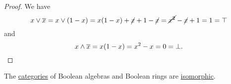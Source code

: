 \begin{proof}
   We have
  \begin{equation*}
    x \vee \oline x
    =
    x \vee (1 - x)
    =
    x(1 - x) + \cancel{x} + 1 - \cancel{x}
    =
    \cancel{x^2} - \cancel{x} + 1
    =
    1
    =
    \top
  \end{equation*}
  and
  \begin{equation*}
    x \wedge \oline x
    =
    x(1 - x)
    =
    x^2 - x
    =
    0
    =
    \bot.
  \end{equation*}
\end{proof}

\begin{proposition}\label{thm:categories_of_boolean_algebras_and_ring}
  The \hyperref[def:category]{categories} of Boolean algebras and Boolean rings are \hyperref[rem:category_similarity/isomorphism]{isomorphic}.
\end{proposition}
